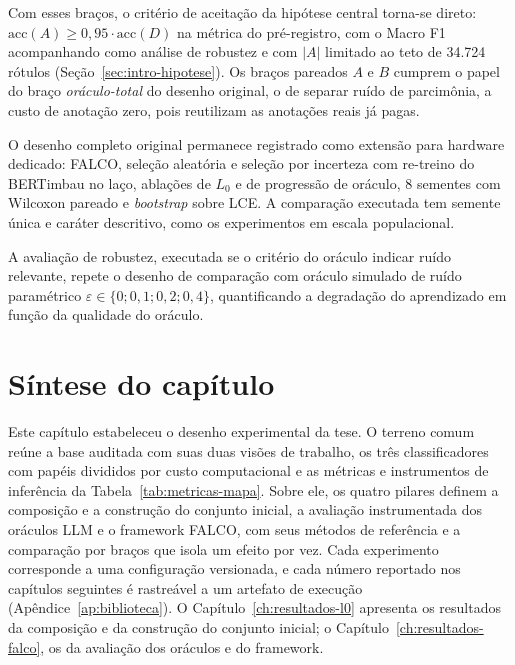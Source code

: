 Com esses braços, o critério de aceitação da hipótese central torna-se direto:
$\mathrm{acc}(A) \ge 0{,}95 \cdot \mathrm{acc}(D)$ na métrica do
pré-registro, com o Macro F1 acompanhando como análise de robustez e com $|A|$
limitado ao teto de 34.724 rótulos (Seção~\ref{sec:intro-hipotese}). Os braços
pareados $A$ e $B$ cumprem o papel do braço \emph{oráculo-total} do desenho
original, o de separar ruído de parcimônia, a custo de anotação zero, pois
reutilizam as anotações reais já pagas.

O desenho completo original permanece registrado como extensão para hardware
dedicado: FALCO, seleção aleatória e seleção por incerteza com re-treino do
BERTimbau no laço, ablações de $L_0$ e de progressão de oráculo, 8 sementes com
Wilcoxon pareado e \textit{bootstrap} sobre LCE. A comparação executada tem
semente única e caráter descritivo, como os experimentos em escala
populacional.

A avaliação de robustez, executada se o critério do oráculo indicar ruído
relevante, repete o desenho de comparação com oráculo simulado de ruído
paramétrico $\varepsilon \in \{0; 0{,}1; 0{,}2; 0{,}4\}$, quantificando a
degradação do aprendizado em função da qualidade do oráculo.
\section{Síntese do capítulo}
\label{sec:metodo-sintese}

Este capítulo estabeleceu o desenho experimental da tese. O terreno comum
reúne a base auditada com suas duas visões de trabalho, os três
classificadores com papéis divididos por custo computacional e as métricas e
instrumentos de inferência da Tabela~\ref{tab:metricas-mapa}. Sobre ele, os
quatro pilares definem a composição e a construção do conjunto inicial, a
avaliação instrumentada dos oráculos LLM e o framework FALCO, com seus
métodos de referência e a comparação por braços que isola um efeito por vez.
Cada experimento corresponde a uma configuração versionada, e cada número
reportado nos capítulos seguintes é rastreável a um artefato de execução
(Apêndice~\ref{ap:biblioteca}). O Capítulo~\ref{ch:resultados-l0} apresenta
os resultados da composição e da construção do conjunto inicial; o
Capítulo~\ref{ch:resultados-falco}, os da avaliação dos oráculos e do
framework.

